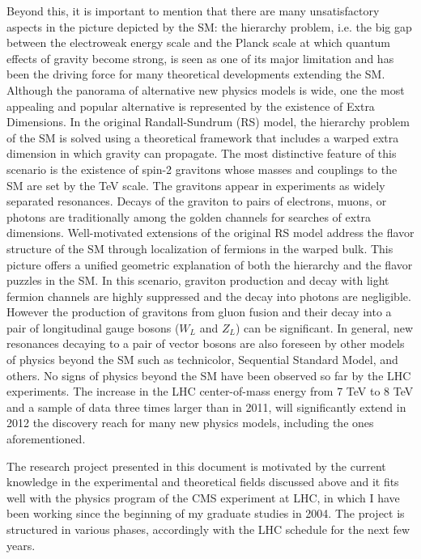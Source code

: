 \documentclass[10pt, a4paper]{article}
\begin{document}
Beyond this, it is important to mention that there are many unsatisfactory aspects in the picture depicted by the SM: the hierarchy problem, i.e. the big gap between the electroweak energy scale and the Planck scale at which quantum effects of gravity become strong, is seen as one of its major limitation and has been the driving force for many theoretical developments extending the SM. Although the panorama of alternative new physics models is wide, one the most appealing and popular alternative is represented by the existence of Extra Dimensions. 
In the original Randall-Sundrum (RS) model, the hierarchy problem of the SM is solved using a theoretical framework that includes a warped extra dimension in which gravity can propagate. The most distinctive feature of this scenario is the existence of spin-2 gravitons whose masses and couplings to the SM are set by the TeV scale. The gravitons 
appear in experiments as widely separated resonances. Decays of the graviton to pairs of electrons, muons, or photons are traditionally among the golden channels for searches of extra dimensions. 
Well-motivated extensions of the original RS model address the flavor structure of the SM through localization of fermions in the warped bulk. This picture offers a unified geometric explanation of both the hierarchy and the flavor puzzles in the SM. In this scenario, graviton production and decay with light fermion channels are highly suppressed and the decay into photons are negligible. However the production of gravitons from gluon fusion and their decay into a pair of longitudinal gauge bosons ($W_L$ and $Z_L$) can be significant. In general, new resonances decaying to a pair of vector bosons are also foreseen by other models of physics beyond the SM such as technicolor, Sequential Standard Model, and others.
No signs of physics beyond the SM have been observed so far by the LHC experiments. The increase in the LHC center-of-mass energy from 7 TeV to 8 TeV and a sample of data three times larger than in 2011, will significantly extend in 2012 the discovery reach for many new physics models, including the ones aforementioned.

The research project presented in this document is motivated by the current knowledge in the experimental and 
theoretical fields discussed above and it fits well with the physics program of the CMS experiment at LHC, in which 
I have been working since the beginning of my graduate studies in 2004. The project is structured in various phases, accordingly with the LHC schedule for the next few years.
\end{document}
